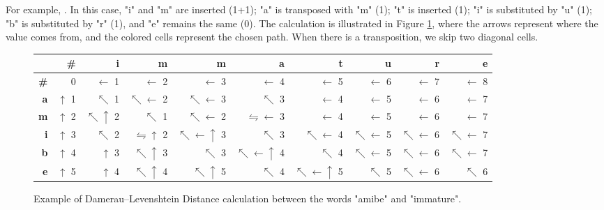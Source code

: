 \documentclass{KBook}
\begin{document}
For example, . In this case, "i" and "m" are inserted (1+1); "a" is transposed with "m" (1); "t" is inserted (1); "i" is substituted by "u" (1); "b" is substituted by "r" (1), and "e" remains the same (0). The calculation is illustrated in Figure \ref{fig:dam-laven-distance}, where the arrows represent where the value comes from, and the colored cells represent the chosen path. When there is a transposition, we skip two diagonal cells.
\begin{figure}[ht]
	\centering
	\begin{tabular}{|r|r|r|r|r|r|r|r|r|r|}
		\hline
		&\bfseries \# &\bfseries i &\bfseries m &\bfseries m &\bfseries a &\bfseries t &\bfseries u &\bfseries r &\bfseries e \\
		\hline
		\bfseries \# & 0 & \cellcolor{green!25} $ \leftarrow $ 1 & \cellcolor{green!25} $ \leftarrow $ 2 & $ \leftarrow $ 3 & $ \leftarrow $ 4 & $ \leftarrow $ 5 & $ \leftarrow $ 6 & $ \leftarrow $ 7 & $ \leftarrow $ 8\\
		\hline
		\bfseries a & $ \uparrow $ 1 & $ \nwarrow $ 1 & $ \nwarrow\leftarrow $ 2 & $ \nwarrow\leftarrow $ 3 & $ \nwarrow $ 3 & $ \leftarrow $ 4 & $ \leftarrow $ 5 & $ \leftarrow $ 6 & $ \leftarrow $ 7 \\
		\hline
		\bfseries m & $ \uparrow $ 2 & $ \nwarrow\uparrow $ 2 & $\nwarrow $ 1 & $\nwarrow\leftarrow $ 2 & \cellcolor{green!25} $\leftrightharpoons\leftarrow $ 3 & \cellcolor{green!25} $\leftarrow $ 4 & $\leftarrow $ 5 & $\leftarrow $ 6 & $\leftarrow $ 7\\
		\hline
		\bfseries i & $ \uparrow $ 3 & $ \nwarrow $ 2 & $\leftrightharpoons\uparrow $ 2 & $\nwarrow\leftarrow\uparrow $ 3 & $\nwarrow $ 3 &  $\nwarrow\leftarrow $ 4 & \cellcolor{green!25} $\nwarrow\leftarrow $ 5 & $\nwarrow\leftarrow $ 6 & $\nwarrow\leftarrow $ 7\\
		\hline
		\bfseries b & $ \uparrow $ 4 & $ \uparrow $ 3 & $\nwarrow\uparrow $ 3 & $\nwarrow $ 3 & $\nwarrow\leftarrow\uparrow $ 4 & $\nwarrow $ 4 & $\nwarrow\leftarrow $ 5 & \cellcolor{green!25} $\nwarrow\leftarrow $ 6 & $\nwarrow\leftarrow $ 7\\
		\hline
		\bfseries e & $ \uparrow $ 5 & $ \uparrow $ 4 & $\nwarrow\uparrow $ 4 & $\nwarrow\uparrow $ 5 & $\nwarrow $ 4 & $\nwarrow\leftarrow\uparrow $ 5 & $\nwarrow $ 5 & $\nwarrow\leftarrow $ 6 & \cellcolor{green!25} $\nwarrow $ 6\\
		\hline
	\end{tabular}
	\caption[Example of Damerau–Levenshtein Distance calculation.]{Example of Damerau–Levenshtein Distance calculation between the words "amibe" and "immature".}
	\label{fig:dam-laven-distance}
\end{figure}
\end{document}
